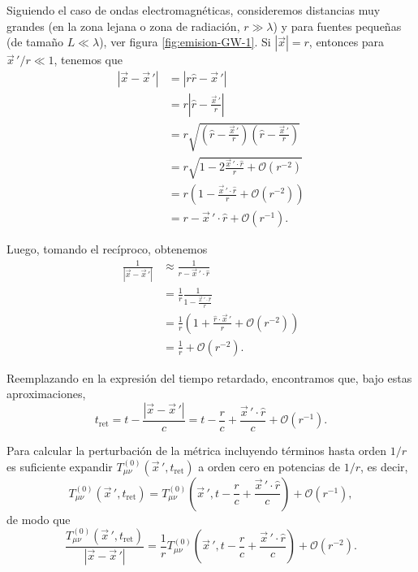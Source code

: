 \documentclass[letterpaper,11pt]{article}
\begin{document}
Siguiendo el caso de ondas electromagnéticas, consideremos distancias muy grandes (en la zona lejana o zona de radiación, $r \gg \lambda$) y para fuentes pequeñas (de tamaño $L \ll \lambda$), ver figura \ref{fig:emision-GW-1}. Si $|\vec{x}| = r$, entonces para $\vec{x}\,'/r \ll 1$, tenemos que
\begin{align}
|\vec{x} - \vec{x}\,'| &= \left|r \hat{r} - \vec{x}\,'\right| \nonumber \\
&= r \left|\hat{r} - \frac{\vec{x}\,'}{r}\right| \nonumber \\
&= r \sqrt{\left( \hat{r} - \frac{\vec{x}\,'}{r}\right)\left( \hat{r} - \frac{\vec{x}\,'}{r}\right)}\nonumber \\
&= r \sqrt{1 - 2 \frac{\vec{x}\,'\cdot \hat{r}}{r} + \mathcal{O}(r^{-2})} \nonumber \\
&= r \left(1 - \frac{\vec{x}\,'\cdot \hat{r}}{r} + \mathcal{O}(r^{-2}) \right) \nonumber \\
&= r - \vec{x}\,' \cdot  \hat{r} + \mathcal{O}(r^{-1}).
\end{align}

Luego, tomando el recíproco, obtenemos
\begin{align}
\frac{1}{|\vec{x} - \vec{x}\,'|} &\approx \frac{1}{r - \vec{x}\,' \cdot  \hat{r}} \nonumber \\
&= \frac{1}{r} \frac{1}{1 - \frac{\vec{x}\,' \cdot  \hat{r}}{r}}  \nonumber \\
&= \frac{1}{r} \left(1 + \frac{\hat{r}\cdot \vec{x}\,'}{r} + \mathcal{O}(r^{-2}) \right) \nonumber \\
&= \frac{1}{r} + \mathcal{O}(r^{-2}).
\end{align}

Reemplazando en la expresión del tiempo retardado, encontramos que, bajo estas aproximaciones,
\begin{equation}
t_{\text{ret}} = t - \frac{|\vec{x} - \vec{x}\,'|}{c} = t - \frac{r}{c} + \frac{\vec{x}\,'\cdot \hat{r}}{c} + \mathcal{O}(r^{-1}).
\end{equation}

Para calcular la perturbación de la métrica incluyendo términos hasta orden $1/r$ es suficiente expandir $T_{\mu\nu}^{(0)}(\vec{x}\,',t_{\text{ret}})$ a orden cero en potencias de $1/r$, es decir,
\begin{equation}
T_{\mu\nu}^{(0)}(\vec{x}\,',t_{\text{ret}}) = T_{\mu\nu}^{(0)}\left(\vec{x}\,', t - \frac{r}{c} + \frac{\vec{x}\,'\cdot\hat{r}}{c}\right) + \mathcal{O}(r^{-1}),
\end{equation}
de modo que 
\begin{equation}
\frac{T_{\mu\nu}^{(0)}(\vec{x}\,', t_{\text{ret}})}{|\vec{x} - \vec{x}\,'|} = \frac{1}{r}  T_{\mu\nu}^{(0)}\left(\vec{x}\,', t - \frac{r}{c} + \frac{\vec{x}\,'\cdot\hat{r}}{c}\right) + \mathcal{O}(r^{-2}). 
\end{equation} 
\end{document}
